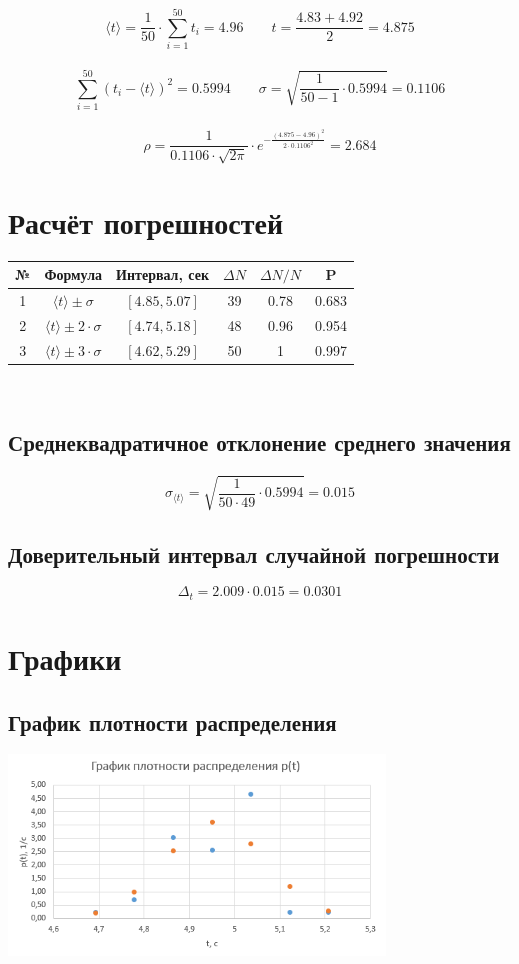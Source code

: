 \documentclass[12pt,a4paper]{article}
\begin{document}
$$\langle t\rangle=\frac{1}{50}\cdot\sum_{i=1}^{50}{t_i}=4.96  \qquad t=\frac{4.83 + 4.92}{2}=4.875$$ \\
$$\sum_{i=1}^{50}(t_i - \langle t\rangle)^2=0.5994\qquad\sigma=\sqrt{\frac{1}{50 - 1}\cdot0.5994}=0.1106$$ \\
$$\rho=\frac{1}{0.1106\cdot\sqrt{2\pi}}\cdot e^{-\frac{(4.875-4.96)^2}{2\cdot0.1106^2}}=2.684$$
\section{Расчёт погрешностей}
\begin{tabular}{|c|c|c|c|c|c|}
    \hline
    № & Формула & Интервал, сек & $\Delta N$ & $\Delta N / N$ & P \\
    \hline
    1 & $\langle t\rangle \pm \sigma$ & $[4.85, 5.07]$ & 39 & 0.78 & 0.683 \\
    \hline
    2 & $\langle t\rangle \pm 2\cdot\sigma$ & $[4.74, 5.18]$ & 48 & 0.96 & 0.954 \\
    \hline
    3 & $\langle t\rangle \pm 3\cdot\sigma$ & $[4.62, 5.29]$ & 50 & 1 & 0.997 \\
    \hline
\end{tabular} \\
\hfill\break
\subsection{Среднеквадратичное отклонение среднего значения}
$$\sigma_{\langle t\rangle}=\sqrt{\frac{1}{50\cdot 49}\cdot0.5994}=0.015$$
\subsection{Доверительный интервал случайной погрешности}
$$\Delta_t=2.009\cdot0.015=0.0301$$
\section{Графики} 
\subsection{График плотности распределения}
\begin{center}
    \includegraphics[width=10cm]{graph.png}
\end{center}
\end{document}

